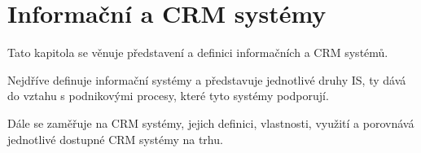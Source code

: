 \chapter{Informační a CRM systémy}
Tato kapitola se věnuje představení a definici informačních a CRM systémů. 

Nejdříve definuje informační systémy a představuje jednotlivé druhy IS, ty dává do vztahu s podnikovými procesy, které tyto systémy podporují.

Dále se zaměřuje na CRM systémy, jejich definici, vlastnosti, využití a porovnává jednotlivé dostupné CRM systémy na trhu.




